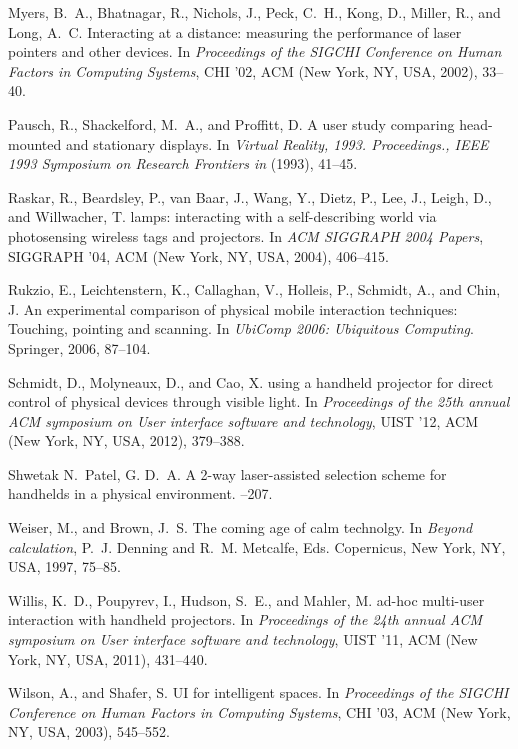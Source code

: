 \documentclass{sigchi}
\begin{document}
\begin{thebibliography}{10}
Myers, B.~A., Bhatnagar, R., Nichols, J., Peck, C.~H., Kong, D., Miller, R.,
  and Long, A.~C.
\newblock Interacting at a distance: measuring the performance of laser
  pointers and other devices.
\newblock In {\em Proceedings of the {SIGCHI} Conference on Human Factors in
  Computing Systems}, {CHI} '02, {ACM} (New York, {NY}, {USA}, 2002), 33–40.

Pausch, R., Shackelford, M.~A., and Proffitt, D.
\newblock A user study comparing head-mounted and stationary displays.
\newblock In {\em Virtual Reality, 1993. Proceedings., {IEEE} 1993 Symposium on
  Research Frontiers in} (1993), 41–45.

Raskar, R., Beardsley, P., van Baar, J., Wang, Y., Dietz, P., Lee, J., Leigh,
  D., and Willwacher, T.
 lamps: interacting with a self-describing world via
  photosensing wireless tags and projectors.
\newblock In {\em {ACM} {SIGGRAPH} 2004 Papers}, {SIGGRAPH} '04, {ACM} (New
  York, {NY}, {USA}, 2004), 406–415.

Rukzio, E., Leichtenstern, K., Callaghan, V., Holleis, P., Schmidt, A., and
  Chin, J.
\newblock An experimental comparison of physical mobile interaction techniques:
  Touching, pointing and scanning.
\newblock In {\em {UbiComp} 2006: Ubiquitous Computing}. Springer, 2006,
  87–104.

Schmidt, D., Molyneaux, D., and Cao, X.
 using a handheld projector for direct control of
  physical devices through visible light.
\newblock In {\em Proceedings of the 25th annual {ACM} symposium on User
  interface software and technology}, {UIST} '12, {ACM} (New York, {NY}, {USA},
  2012), 379–388.

Shwetak N.~Patel, G. D.~A.
\newblock A 2-way laser-assisted selection scheme for handhelds in a physical
  environment.
--207.

Weiser, M., and Brown, J.~S.
\newblock The coming age of calm technolgy.
\newblock In {\em Beyond calculation}, P.~J. Denning and R.~M. Metcalfe, Eds.
  Copernicus, New York, {NY}, {USA}, 1997, 75–85.

Willis, K.~D., Poupyrev, I., Hudson, S.~E., and Mahler, M.
 ad-hoc multi-user interaction with handheld projectors.
\newblock In {\em Proceedings of the 24th annual {ACM} symposium on User
  interface software and technology}, {UIST} '11, {ACM} (New York, {NY}, {USA},
  2011), 431–440.

Wilson, A., and Shafer, S.
 {UI} for intelligent spaces.
\newblock In {\em Proceedings of the {SIGCHI} Conference on Human Factors in
  Computing Systems}, {CHI} '03, {ACM} (New York, {NY}, {USA}, 2003),
  545–552.

\end{thebibliography}
\end{document}
